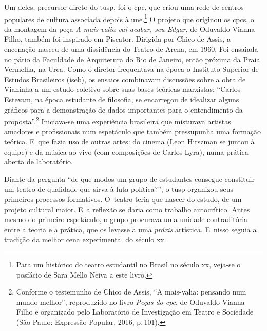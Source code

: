 Um deles, precursor direto do {\sc tusp}, foi o {\sc cpc}, que criou uma rede de
centros populares de cultura associada depois à {\sc une}.\footnote{Para um
  histórico do teatro estudantil no Brasil no século {\sc xx}, veja-se o
  posfácio de Sara Mello Neiva a este livro.} O projeto que originou os
{\sc cpc}s, o da montagem da peça {\it A mais-valia vai acabar, seu Edgar}, de
Oduvaldo Vianna Filho, também foi inspirado em Piscator. Dirigida por
Chico de Assis, a encenação nasceu de uma dissidência do Teatro de Arena,
em 1960. Foi ensaiada no pátio da Faculdade de Arquitetura do Rio de
Janeiro, então próxima da Praia Vermelha, na Urca. Como o diretor
frequentava na época o Instituto Superior de Estudos Brasileiros ({\sc iseb}),
os ensaios combinavam discussões sobre a obra de Vianinha a um estudo
coletivo sobre suas bases teóricas marxistas: “Carlos Estevam, na época
estudante de filosofia, se encarregou de idealizar alguns gráficos para
a demonstração de dados importantes para o entendimento da
proposta”.\footnote{Conforme o testemunho de Chico de Assis, “A
  mais-valia: pensando num mundo melhor”, reproduzido no livro
  {\it Peças do {\sc cpc}}, de Oduvaldo Vianna Filho e organizado pelo Laboratório de Investigação em Teatro e Sociedade (São Paulo:
  Expressão Popular, 2016, p.\,101).} Iniciava-se uma experiência
brasileira que misturava artistas amadores e profissionais num
espetáculo que também pressupunha uma formação teórica. E~que
fazia uso de outras artes: do cinema (Leon Hirszman se juntou à equipe)
e da música ao vivo (com composições de Carlos Lyra), numa prática
aberta de laboratório.


Diante da pergunta “de que modos um grupo de estudantes consegue
constituir um teatro de qualidade que sirva à luta política?”, o {\sc tusp}
organizou seus primeiros processos formativos. O~teatro teria que nascer
do estudo, de um projeto cultural maior. E~a reflexão se daria como
trabalho autocrítico. Antes mesmo do primeiro espetáculo, o grupo
procurava uma unidade contraditória entre a teoria e a prática, que os
levasse a uma {\it práxis} artística. E~nisso seguia a tradição da
melhor cena experimental do século {\sc xx}.

